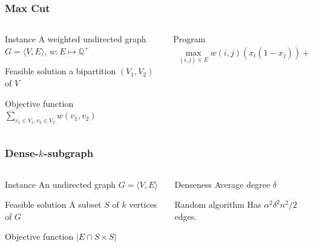 \documentclass[12pt,aspectratio=169]{beamer}
\begin{document}
\begin{frame}\frametitle{Max Cut }
\begin{columns} 
  \begin{column}{0.48\textwidth}
  \begin{block}{Instance}
    A weighted undirected  graph $G=\langle V,E \rangle$, $w:E\mapsto \mathbb{Q}^{+}$
  \end{block}
  \begin{block}{Feasible solution}
    a bipartition $(V_{1},V_{2})$ of $V$
  \end{block}
  \begin{block}{Objective function}
    $\sum_{v_{1}\in V_{1}, v_{2}\in V_{2}} w(v_{1}, v_{2})$
  \end{block}
\end{column}
\begin{column}{0.48\textwidth}
  \begin{block}{Program}
    \begin{equation}
    \begin{split}
      \max_{(i,j)\in E} w(i,j)\left(x_{i}(1-x_{j})\right) + \left(x_{i}(1-x_{j})\right)%
     \end{split}
   \end{equation}
 \end{block}
\end{column}
\end{columns}
\end{frame}

\begin{frame}\frametitle{Dense-$k$-subgraph }
\begin{columns} 
  \begin{column}{0.48\textwidth}
  \begin{block}{Instance}
    An undirected  graph $G=\langle V,E \rangle$
  \end{block}
  \begin{block}{Feasible solution}
    A subset $S$ of $k$ vertices of $G$
  \end{block}
  \begin{block}{Objective function}
    $|E\cap S\times S|$
  \end{block}
\end{column}
\begin{column}{0.48\textwidth}
  \begin{block}{Denseness}
    Average degree $\delta$%
 \end{block}
  \begin{block}{Random algorithm}
    Has $\alpha^{2} \delta^{2} n^{2}/2$ edges.
%
 \end{block}
\end{column}
\end{columns}
\end{frame}
\end{document}
